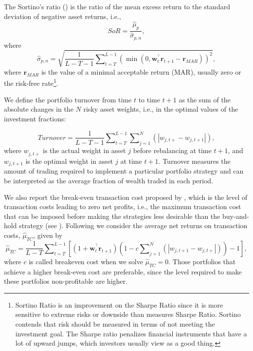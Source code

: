 \documentclass[a4paper,10pt]{article}
\begin{document}
The Sortino's ratio (\citet*{sortino1994}) is the ratio of the mean excess return to the standard deviation of negative asset returns, i.e.,
\begin{equation}
SoR=\frac{\widehat{\mu }_{p}}{\widehat{\sigma }_{p,n}},
\end{equation}%
where
\begin{equation}
\widehat{\sigma }_{p,n}=\sqrt{\frac{1}{L-T-1}\sum\nolimits_{t=T}^{L-1}\left(
	\min \left( 0,\mathbf{w}_{t}^{^{\top }}\mathbf{r}_{t+1}-\mathbf{r}%
	_{MAR}\right) \right) ^{2}},
\end{equation}%
where $\mathbf{r}_{MAR}$ is the value of a minimal acceptable return (MAR),
usually zero or the risk-free rate\footnote{Sortino Ratio is an improvement on the Sharpe Ratio since it is more sensitive to extreme risks or downside than measures Sharpe Ratio. Sortino contends that risk should be measured in terms of not meeting the investment goal. The Sharpe ratio penalizes financial instruments that have a lot of upward jumps, which investors usually view as a good thing.}.

We define the portfolio turnover from time $t$ to time $t+1$ as the sum of the absolute changes in the $N$ risky asset weights, i.e., in the optimal values of the investment fractions:

\begin{equation}
Turnover=\frac{1}{L-T-1}\sum\nolimits_{t=T}^{L-1}\sum\nolimits_{j=1}^{N}%
\left( \left\vert w_{j,t+}-w_{j,t+1}\right\vert \right) ,
\end{equation}%
where $w_{j,t+}^{{}}$ is the actual weight in asset $j$ before rebalancing at time $t+1$, and $w_{j,t+1}$ is the optimal weight in asset $j$ at time $t+1$. Turnover measures the amount of trading required to implement a particular portfolio strategy and can be interpreted as the average fraction of wealth traded in each period. 

We also report the break-even transaction cost proposed by \citet*{bessembinder1995}, which is the level of transaction costs leading to zero net profits, i.e., the maximum transaction cost that can be imposed before making the strategies less desirable than the buy-and-hold strategy (see \citet*{han2006}). Following \citet*{santos2012} we consider the average net returns on transaction costs, $\widehat{\mu }_{TC}$, given by
\begin{equation}
\widehat{\mu }_{TC}=\frac{1}{L-T}\sum\nolimits_{t=T}^{L-1}\left[ \left( 1+%
\mathbf{w}_{t}^{^{\top }}\mathbf{r}_{t+1}\right) \left(
1-c\sum\nolimits_{j=1}^{N}\left( \left\vert w_{j,t+1}-w_{j,t+}\right\vert
\right) \right) -1\right] ,
\end{equation}%
where $c$ is called breakeven cost when we solve $\widehat{\mu }_{TC}=0.$ Those portfolios that achieve a higher break-even cost are preferable, since the level required to make these portfolios non-profitable are higher.
\end{document}
